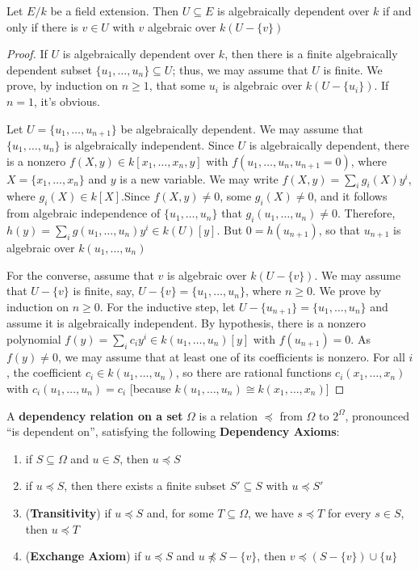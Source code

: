 \documentclass[11pt]{article}
\begin{document}
\begin{proposition}[]
\label{nprop5.66}
Let \(E/k\) be a field extension. Then \(U\subseteq E\) is algebraically
dependent over \(k\) if and only if there is \(v\in U\) with \(v\) algebraic
over \(k(U-\{v\})\)
\end{proposition}

\begin{proof}
If \(U\) is algebraically dependent over \(k\), then there is a finite
algebraically dependent subset \(\{u_1,\dots,u_n\}\subseteq U\); thus, we may
assume that \(U\) is finite. We prove, by induction on \(n\ge1\), that some
\(u_i\) is algebraic over \(k(U-\{u_i\})\). If \(n=1\), it's obvious.

Let \(U=\{u_1,\dots,u_{n+1}\}\) be algebraically dependent. We may assume
that \(\{u_1,\dots,u_n\}\) is algebraically independent. Since \(U\) is
algebraically dependent, there is a nonzero 
\(f(X,y)\in k[x_1,\dots,x_n,y]\) with \(f(u_1,\dots,u_n,u_{n+1}=0)\), where
\(X=\{x_1,\dots,x_n\}\) and \(y\) is a new variable. We may write 
\(f(X,y)=\sum_ig_i(X)y^i\), where \(g_i(X)\in k[X]\).Since \(f(X,y)\neq0\),
some \(g_i(X)\neq0\), and it follows from algebraic independence of
\(\{u_1,\dots,u_n\}\) that \(g_i(u_1,\dots,u_n)\neq0\). Therefore,
\(h(y)=\sum_ig(u_1,\dots,u_n)y^i\in k(U)[y]\). But \(0=h(u_{n+1})\), so that
\(u_{n+1}\) is algebraic over \(k(u_1,\dots,u_n)\)

For the converse, assume that \(v\) is algebraic over \(k(U-\{v\})\). We may
assume that \(U-\{v\}\) is finite, say, \(U-\{v\}=\{u_1,\dots,u_n\}\), where
\(n\ge0\). We prove by induction on \(n\ge0\). For the inductive step, let 
\(U-\{u_{n+1}\}=\{u_1,\dots,u_n\}\) and assume it is algebraically
independent. By hypothesis, there is a nonzero polynomial 
\(f(y)=\sum_ic_iy^i\in k(u_1,\dots,u_n)[y]\) with \(f(u_{n+1})=0\). As
\(f(y)\neq0\), we may assume that at least one of its coefficients is
nonzero. For all \(i\), the coefficient \(c_i\in k(u_1,\dots,u_n)\), so there
are rational functions \(c_i(x_1,\dots,x_n)\) with
\(c_i(u_1,\dots,u_n)=c_i\) [because 
\(k(u_1,\dots,u_n)\cong k(x_1,\dots,x_n)\)]
\end{proof}

\begin{definition}[]
A \textbf{dependency relation on a set} \(\Omega\) is a relation \(\preceq\) from \(\Omega\)
to \(2^\Omega\), pronounced ``is dependent on'', satisfying the following 
\textbf{Dependency Axioms}:
\begin{enumerate}
\item if \(S\subseteq\Omega\) and \(u\in S\), then \(u\preceq S\)
\item if \(u\preceq S\), then there exists a finite subset \(S'\subseteq S\)
with \(u\preceq S'\)
\item (\textbf{Transitivity}) if \(u\preceq S\) and, for some \(T\subseteq\Omega\), we
have \(s\preceq T\) for every \(s\in S\), then \(u\preceq T\)
\item (\textbf{Exchange Axiom}) if \(u\preceq S\) and \(u\not\preceq S-\{v\}\), then
\(v\preceq (S-\{v\})\cup\{u\}\)
\end{enumerate}
\end{definition}
\end{document}
